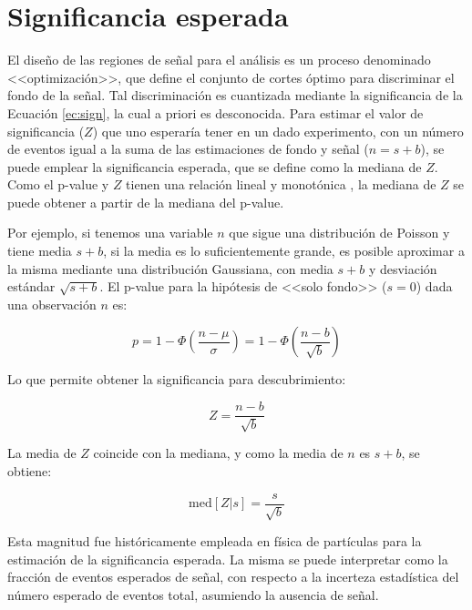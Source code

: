 
 


\section{Significancia esperada}\label{sec:exp_sig}

El diseño de las regiones de señal para el análisis es un proceso denominado <<optimización>>, que define el conjunto de cortes óptimo para discriminar el fondo de la señal. Tal discriminación es cuantizada mediante la significancia de la Ecuación \ref{ec:sign}, la cual a priori es desconocida. Para estimar el valor de significancia ($Z$) que uno esperaría tener en un dado experimento, con un número de eventos igual a la suma de las estimaciones de fondo y señal ($n=s+b$), se puede emplear la significancia esperada, que se define como la mediana de $Z$. Como el p-value y $Z$ tienen una relación lineal y monotónica \cite{Cowan:2010js}, la mediana de $Z$ se puede obtener a partir de la mediana del p-value.


Por ejemplo, si tenemos una variable $n$ que sigue una distribución de Poisson y tiene media $s+b$, si la media es lo suficientemente grande, es posible aproximar a la misma mediante una distribución Gaussiana, con media $s+b$ y desviación estándar $\sqrt{s+b}$. El p-value para la hipótesis de <<solo fondo>> ($s=0$) dada una observación $n$ es:

\begin{equation}
	p = 1 - \Phi\left( \frac{n-\mu}{\sigma} \right) = 1 - \Phi\left( \frac{n-b}{\sqrt{b}} \right)
\end{equation}

Lo que permite obtener la significancia para descubrimiento:

\begin{equation}
	Z = \frac{n-b}{\sqrt{b}}
\end{equation}

La media de $Z$ coincide con la mediana, y como la media de $n$ es $s+b$, se obtiene:

\begin{equation}
	\text{med}[Z|s] = \frac{s}{\sqrt{b}}
\end{equation}

Esta magnitud fue históricamente empleada en física de partículas para la estimación de la significancia esperada. La misma se puede interpretar como la fracción de eventos esperados de señal, con respecto a la incerteza estadística del número esperado de eventos total, asumiendo la ausencia de señal.

